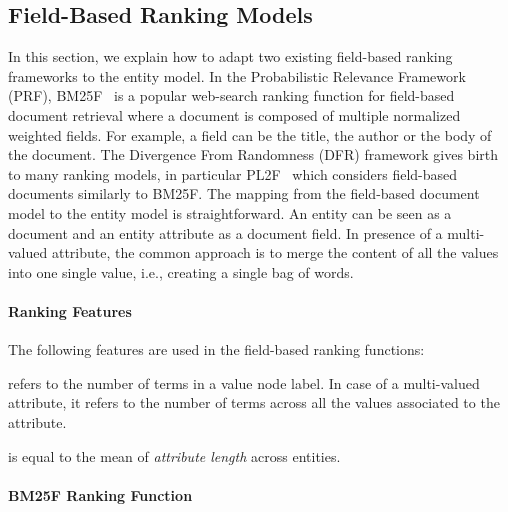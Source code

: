 \subsection{Field-Based Ranking Models}
\label{sec:ranking-wod}

In this section, we explain how to adapt two existing field-based ranking frameworks to the entity model. In the Probabilistic Relevance Framework (PRF), BM25F~\cite{zaragoza:2004:microsoft} is a popular web-search ranking function for field-based document retrieval where a document is composed of multiple normalized weighted fields. For example, a field can be the title, the author or the body of the document. The Divergence From Randomness (DFR) framework gives birth to many ranking models, in particular  PL2F~\cite{macdonald:2005:clef} which considers field-based documents similarly to BM25F. The mapping from the field-based document model to the entity model is straightforward. An entity can be seen as a document and an entity attribute as a document field. In presence of a multi-valued attribute, the common approach is to merge the content of all the values into one single value, i.e., creating a single bag of words.%

\paragraph{Ranking Features}

The following features are used in the field-based ranking functions:
\begin{description}
  \item[attribute length] refers to the number of terms in a value node label. In case of a multi-valued attribute, it refers to the number of terms across all the values associated to the attribute.
  \item[average attribute length] is equal to the mean of \emph{attribute length} across entities.
\end{description}

\paragraph{BM25F Ranking Function}

